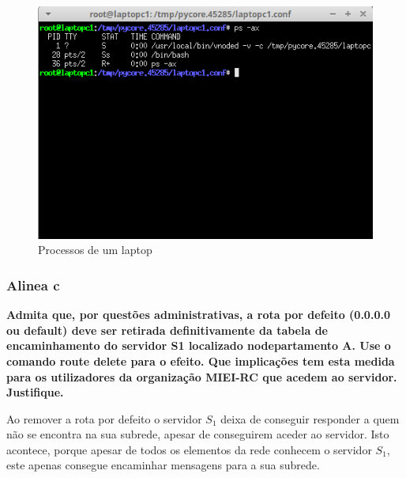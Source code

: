 \documentclass{article}
\begin{document}
\newpage

\begin{figure}[h]
	\centering
	\includegraphics[scale = 0.6]{processos-laptop-ex2b.png}
	\caption{Processos de um laptop}
\end{figure}


\subsubsection{Alinea c}
\textbf{Admita que, por questões administrativas, a rota por defeito (0.0.0.0 ou  default) deve ser retirada definitivamente da tabela de encaminhamento do servidor S1  localizado nodepartamento A. Use o comando route delete para o efeito. Que implicações tem esta medida para os utilizadores da organização MIEI-RC que acedem ao servidor. Justifique.}\\\par
Ao remover a rota por defeito o servidor $S_1$ deixa de conseguir responder a quem não se encontra na sua subrede, apesar de conseguirem aceder ao servidor. Isto acontece, porque apesar de todos os elementos da rede conhecem o servidor $S_1$, este apenas consegue encaminhar mensagens para a sua subrede.\\
\end{document}
